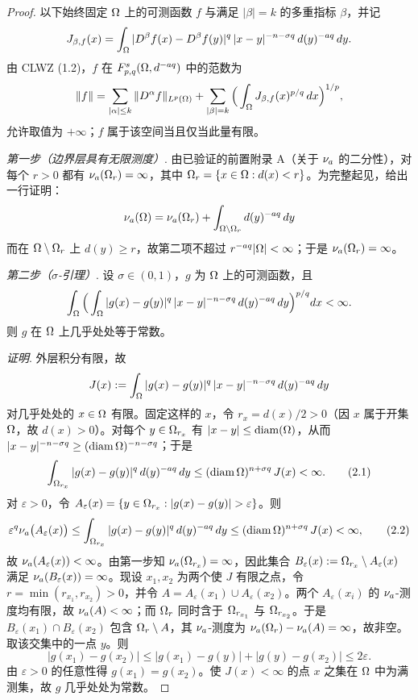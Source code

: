 \begin{proof}
以下始终固定 $\Omega$ 上的可测函数 $f$ 与满足 $|\beta|=k$ 的多重指标 $\beta$，并记
\[
  J_{\beta,f}(x)=\int_\Omega |D^\beta f(x)-D^\beta f(y)|^q\,|x-y|^{-n-\sigma q}\,d(y)^{-aq}\,dy .
\]
由 CLWZ (1.2)，$f$ 在 $F^{s}_{p,q}(\Omega,d^{-aq})$ 中的范数为
\[
  \|f\|=\sum_{|\alpha|\le k}\|D^\alpha f\|_{L^p(\Omega)}
  +\sum_{|\beta|=k}\Big(\int_\Omega J_{\beta,f}(x)^{p/q}\,dx\Big)^{1/p},
\]
允许取值为 $+\infty$；$f$ 属于该空间当且仅当此量有限。

\emph{第一步（边界层具有无限测度）}. 由已验证的前置附录 A（关于 $\nu_{a}$ 的二分性），对每个 $r>0$ 都有 $\nu_{a}(\Omega_{r})=\infty$，其中 $\Omega_{r}=\{x\in\Omega : d(x)<r\}$。为完整起见，给出一行证明：
\[
  \nu_{a}(\Omega)=\nu_{a}(\Omega_{r})+\int_{\Omega\setminus\Omega_{r}} d(y)^{-aq}\,dy
\]
而在 $\Omega\setminus\Omega_{r}$ 上 $d(y)\ge r$，故第二项不超过 $r^{-aq}|\Omega|<\infty$；于是 $\nu_{a}(\Omega_{r})=\infty$。

\emph{第二步（$\sigma$-引理）}. 设 $\sigma\in(0,1)$，$g$ 为 $\Omega$ 上的可测函数，且
\[
  \int_\Omega\Big(\int_\Omega |g(x)-g(y)|^q\,|x-y|^{-n-\sigma q}\,d(y)^{-aq}\,dy\Big)^{p/q}dx<\infty .
\]
则 $g$ 在 $\Omega$ 上几乎处处等于常数。

\emph{证明}. 外层积分有限，故
\[
  J(x):=\int_\Omega |g(x)-g(y)|^q\,|x-y|^{-n-\sigma q}\,d(y)^{-aq}\,dy
\]
对几乎处处的 $x\in\Omega$ 有限。固定这样的 $x$，令 $r_x=d(x)/2>0$（因 $x$ 属于开集 $\Omega$，故 $d(x)>0$）。对每个 $y\in\Omega_{r_x}$ 有 $|x-y|\le\operatorname{diam}(\Omega)$，从而 $|x-y|^{-n-\sigma q}\ge(\operatorname{diam}\Omega)^{-n-\sigma q}$；于是
\begin{equation}
  \int_{\Omega_{r_x}} |g(x)-g(y)|^q\,d(y)^{-aq}\,dy
  \le(\operatorname{diam}\Omega)^{n+\sigma q}\,J(x)<\infty . \tag{2.1}
\end{equation}
对 $\varepsilon>0$，令 $A_\varepsilon(x)=\{y\in\Om_{r_x} : |g(x)-g(y)|>\varepsilon\}$。则
\begin{equation}
  \varepsilon^q\nu_{a}\big(A_\varepsilon(x)\big)
  \le\int_{\Omega_{r_x}} |g(x)-g(y)|^q\,d(y)^{-aq}\,dy
  \le(\operatorname{diam}\Omega)^{n+\sigma q}\,J(x)<\infty , \tag{2.2}
\end{equation}
故 $\nu_{a}(A_\varepsilon(x))<\infty$。由第一步知 $\nu_{a}(\Omega_{r_x})=\infty$，因此集合 $B_\varepsilon(x):=\Omega_{r_x}\setminus A_\varepsilon(x)$ 满足 $\nu_{a}(B_\varepsilon(x))=\infty$。现设 $x_1,x_2$ 为两个使 $J$ 有限之点，令 $r=\min(r_{x_1},r_{x_2})>0$，并令 $A=A_\varepsilon(x_1)\cup A_\varepsilon(x_2)$。两个 $A_\varepsilon(x_i)$ 的 $\nu_{a}$-测度均有限，故 $\nu_{a}(A)<\infty$；而 $\Omega_r$ 同时含于 $\Omega_{r_{x_1}}$ 与 $\Omega_{r_{x_2}}$。于是 $B_\varepsilon(x_1)\cap B_\varepsilon(x_2)$ 包含 $\Omega_r\setminus A$，其 $\nu_{a}$-测度为 $\nu_{a}(\Omega_r)-\nu_{a}(A)=\infty$，故非空。取该交集中的一点 $y$。则
\[
  |g(x_1)-g(x_2)|\le|g(x_1)-g(y)|+|g(y)-g(x_2)|\le 2\varepsilon .
\]
由 $\varepsilon>0$ 的任意性得 $g(x_1)=g(x_2)$。使 $J(x)<\infty$ 的点 $x$ 之集在 $\Omega$ 中为满测集，故 $g$ 几乎处处为常数。


\end{proof}
